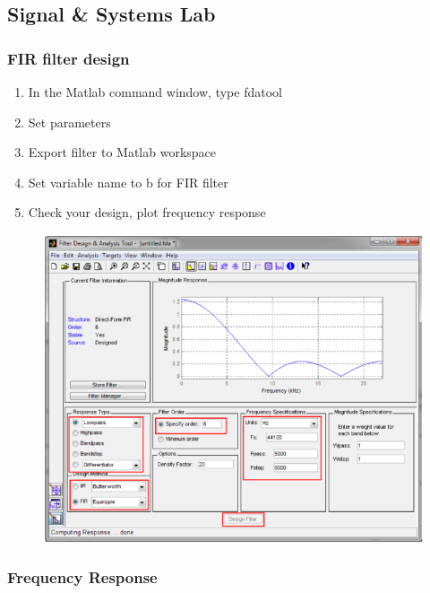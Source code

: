 \documentclass[hyperref={pdfpagelabels=true}]{beamer}
\begin{document}
\subsection{Signal \& Systems Lab}

\begin{frame}
\frametitle{FIR filter design}
\begin{enumerate}
\item In the Matlab command window, type fdatool
\item Set parameters
\item Export filter to Matlab workspace
\item Set variable name to b for FIR filter
\item Check your design, plot frequency response
\end{enumerate}
\begin{figure}[!tbp]
\centering
\includegraphics[width=\textwidth,height=\textheight,keepaspectratio]{figs/fdb.png}
\end{figure}
\end{frame}


\begin{frame}
\frametitle{Frequency Response}
\end{frame}
\end{document}
